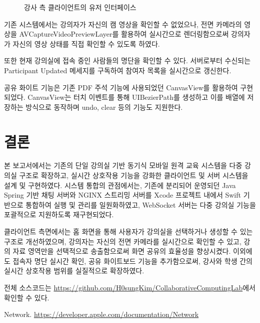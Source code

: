 \documentclass[10pt, a4paper, oneside]{article}
\begin{document}
\begin{figure}[htbp]
    \begin{center}
        \caption{강사 측 클라이언트의 유저 인터페이스}
        \label{fig:fig3}
    \end{center}
\end{figure}
기존 시스템에서는 강의자가 자신의 캠 영상을 확인할 수 없었으나, 전면 카메라의 영상을 AVCaptureVideoPreviewLayer를 활용하여 실시간으로 렌더링함으로써 강의자가 자신의 영상 상태를 직접 확인할 수 있도록 하였다.

또한 현재 강의실에 접속 중인 사람들의 명단을 확인할 수 있다. 서버로부터 수신되는 Participant Updated 메세지를 구독하여 참여자 목록을 실시간으로 갱신한다.

공유 화이트 기능은 기존 PDF 주석 기능에 사용되었던 CanvasView를 활용하여 구현되었다. CanvasView는 터치 이벤트를 통해 UIBezierPath를 생성하고 이를 배열에 저장하는 방식으로 동작하며 undo, clear 등의 기능도 지원한다.

\section{결론}
본 보고서에서는 기존의 단일 강의실 기반 동기식 모바일 원격 교육 시스템을 다중 강의실 구조로 확장하고, 실시간 상호작용 기능을 강화한 클라이언트 및 서버 시스템을 설계 및 구현하였다. 시스템 통합의 관점에서는, 기존에 분리되어 운영되던 Java Spring 기반 채팅 서버와 NGINX 스트리밍 서버를 Xcode 프로젝트 내에서 Swift 기반으로 통합하여 실행 및 관리를 일원화하였고, WebSocket 서버는 다중 강의실 기능을 포괄적으로 지원하도록 재구현되었다.

클라이언트 측면에서는 홈 화면을 통해 사용자가 강의실을 선택하거나 생성할 수 있는 구조로 개선하였으며, 강의자는 자신의 전면 카메라를 실시간으로 확인할 수 있고, 강의 자료 영역만을 선택적으로 송출함으로써 화면 공유의 효율성을 향상시켰다. 이외에도 접속자 명단 실시간 확인, 공유 화이트보드 기능을 추가함으로써, 강사와 학생 간의 실시간 상호작용 범위를 실질적으로 확장하였다.

전체 소스코드는 \href{https://github.com/H0sungKim/CollaborativeComputingLab}{https://github.com/H0sungKim/CollaborativeComputingLab}에서 확인할 수 있다.

\begin{thebibliography}{1}
Network. \href{https://developer.apple.com/documentation/Network}{https://developer.apple.com/documentation/Network}
\end{thebibliography}
\end{document}

